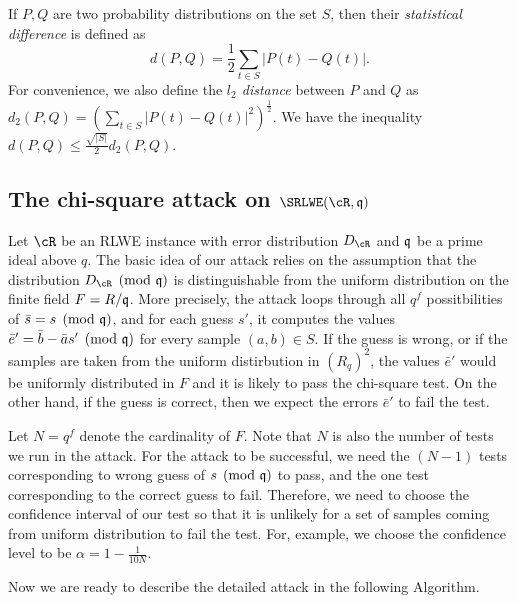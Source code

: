 \documentclass{amsart}
\begin{document}
If $P,Q$ are two probability distributions on the set $S$, then their {\it statistical difference} is defined as
\[
    d(P,Q) = \frac{1}{2} \sum_{t \in S} |P(t) - Q(t)|.
\]
For convenience, we also define the {\it $l_2$ distance} between $P$ and $Q$ as $d_2(P,Q) = (\sum_{t \in S} |P(t) - Q(t)|^2)^{\frac{1}{2}}$. We have the inequality $d(P,Q) \leq \frac{\sqrt{|S|}}{2}d_2(P,Q)$.



\subsection{The chi-square attack on $\SRLWE(\cR,\fq)$}

Let $\cR$ be an RLWE instance with error distribution $D_{\cR}$ and $\mathfrak{q}$ be a prime ideal above $q$.  The basic idea of our attack relies on the assumption that the distribution $D_\cR \pmod {\fq}$ is distinguishable from the uniform distribution on the finite field $F = R/\mathfrak{q}$. More precisely, the attack loops through all $q^f$ possitbilities of $\bar{s} = s \pmod{\mathfrak{q}}$, and for each guess $s'$, it computes the values $\bar{e}' = \bar{b} - \bar{a} s' \pmod {\mathfrak{q}}$ for every sample $(a,b) \in S$. If the guess is wrong, or if the samples are taken from the uniform distirbution in $(R_q)^2$, the values $\bar{e}'$ would be uniformly distributed in $F$ and it is likely to pass the chi-square test. On the other hand, if the guess is correct, then we expect the errors $\bar{e}'$ to fail the test.

Let $N = q^f$ denote the cardinality of $F$. Note that $N$ is also the number of tests we run in the attack. For the attack to be successful, we need the $(N-1)$ tests corresponding to wrong guess of $s \pmod{\mathfrak{q}}$ to pass, and the one test corresponding to the correct guess to fail. Therefore, we need to choose the confidence interval of our test so that it is unlikely for a set of samples coming from uniform distribution to fail the test. For, example, we choose the confidence level to be  $\alpha = 1 - \frac{1}{10N}$.


Now we are ready to describe the detailed attack in the following Algorithm.



\end{document}
